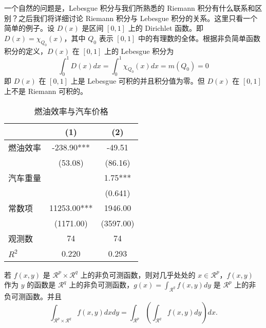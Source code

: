 \documentclass[cn,hazy,blue,screen,14pt]{elegantnote}
\begin{document}
一个自然的问题是，Lebesgue 积分与我们所熟悉的 Riemann 积分有什么联系和区别？之后我们将详细讨论 Riemann 积分与 Lebesgue 积分的关系。这里只看一个简单的例子。设 $D(x)$ 是区间 $[0,1]$ 上的 Dirichlet 函数。即 $D(x)=\chi_{Q_0}(x)$，其中 $Q_0$ 表示 $[0,1]$ 中的有理数的全体。根据非负简单函数积分的定义，$D(x)$ 在 $[0,1]$ 上的 Lebesgue 积分为
\begin{equation}\label{inter2}
  \int_0^1 D(x)dx = \int_0^1 \chi_{Q_0} (x) dx = m(Q_0) = 0
\end{equation}
即 $D(x)$ 在 $[0,1]$ 上是 Lebesgue 可积的并且积分值为零。但 $D(x)$ 在 $[0,1]$ 上不是 Riemann 可积的。

\begin{table}[htbp]
  \centering
  \small
  \caption{燃油效率与汽车价格}
    \begin{tabular}{lcc}
    \toprule
                  &       (1)         &        (2)      \\
    \midrule
    燃油效率      &   -238.90***      &      -49.51     \\
                  &    (53.08)        &      (86.16)    \\
    汽车重量      &                   &        1.75***  \\
                  &                   &       (0.641)   \\
    常数项        &  11253.00***      &    1946.00      \\
                  &  (1171.00)        &   (3597.00)     \\
    观测数        &     74            &      74         \\
    $R^2$         &      0.220        &       0.293     \\
    \bottomrule
    \end{tabular}%
  \label{tab:reg}%
\end{table}%

\begin{theorem}[Fubini 定理]\label{thm:fubi}
若 $f(x,y)$ 是 $\mathcal{R}^p\times\mathcal{R}^q$ 上的非负可测函数，则对几乎处处的 $x\in \mathcal{R}^p$，$f(x,y)$ 作为 $y$ 的函数是 $\mathcal{R}^q$ 上的非负可测函数，$g(x)=\int_{\mathcal{R}^q}f(x,y) dy$ 是 $\mathcal{R}^p$ 上的非负可测函数。并且
\begin{equation}\label{eq:461}
  \int_{\mathcal{R}^p\times\mathcal{R}^q} f(x,y) dxdy=\int_{\mathcal{R}^p}\left(\int_{\mathcal{R}^q}f(x,y)dy\right)dx.
\end{equation}
\end{theorem}
\end{document}
